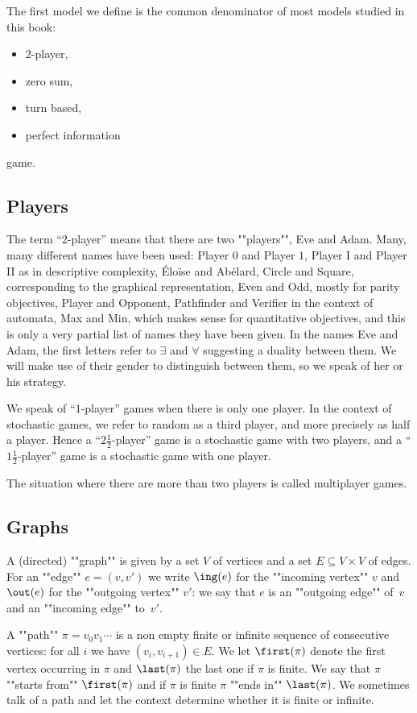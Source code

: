 The first model we define is the common denominator of most models studied in this book:
\begin{itemize}
	\item $2$-player,
	\item zero sum,
	\item turn based,
	\item perfect information
\end{itemize}
game.

\subsection*{Players}
The term ``$2$-player'' means that there are two ""players"", Eve and Adam.
Many, many different names have been used: Player $0$ and Player $1$, 
Player I and Player II as in descriptive complexity,
{\'E}lo{\"i}se and Ab{\'e}lard, Circle and Square, corresponding to the graphical representation, 
Even and Odd, mostly for parity objectives, Player and Opponent, Pathfinder and Verifier in the context of automata,
Max and Min, which makes sense for quantitative objectives,
and this is only a very partial list of names they have been given.
In the names Eve and Adam, the first letters refer to $\exists$ and $\forall$ suggesting a duality between them.
We will make use of their gender to distinguish between them, so we speak of her or his strategy.

We speak of ``$1$-player'' games when there is only one player.
In the context of stochastic games, we refer to random as a third player, and more precisely as half a player.
Hence a ``$2\frac{1}{2}$-player'' game is a stochastic game with two players,
and a ``$1\frac{1}{2}$-player'' game is a stochastic game with one player.

The situation where there are more than two players is called multiplayer games.

\subsection*{Graphs}
A (directed) ""graph"" is given by a set $V$ of vertices and a set $E \subseteq V \times V$ of edges.
For an ""edge"" $e = (v,v')$ we write $\ing(e)$ for the ""incoming vertex"" $v$ and 
$\out(e)$ for the ""outgoing vertex"" $v'$:
we say that $e$ is an ""outgoing edge"" of~$v$ and an ""incoming edge"" to~$v'$.

A ""path"" $\pi = v_0 v_1 \cdots$ is a non empty finite or infinite sequence of consecutive vertices: 
for all $i$ we have $(v_i,v_{i+1}) \in E$.
We let $\first(\pi)$ denote the first vertex occurring in $\pi$ and $\last(\pi)$ the last one if $\pi$ is finite.
We say that $\pi$ ""starts from"" $\first(\pi)$ and if $\pi$ is finite $\pi$ ""ends in"" $\last(\pi)$.
We sometimes talk of a path and let the context determine whether it is finite or infinite.

